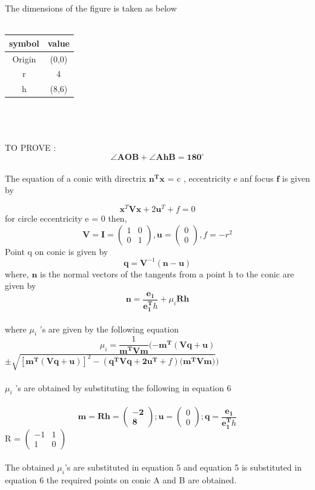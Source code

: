 \documentclass[journal,10pt,twocolumn]{article}
\let\vec\mathbf
\newcommand{\myvec}[1]{\ensuremath{\begin{pmatrix}#1\end{pmatrix}}}
\begin{document}
The dimensions of the figure is taken as below\\\\
{
\setlength\extrarowheight{2pt}
\centering
	\begin{tabular}{|c|c|}
	\hline
	\textbf{symbol}&\textbf{value}\\
	\hline
	Origin&(0,0)\\
	\hline
	r&4\\
	\hline
	h&(8,6)\\
	\hline
\end{tabular}
}
\\\\\\

TO PROVE :
\begin{equation}
	 \boldsymbol{\angle{AOB} + \angle{AhB} = 180^\circ}
\end{equation}\\
	The equation of a conic with directrix $\vec{n^Tx}$ = c , eccentricity e anf focus $\boldsymbol{f}$ is given by
	
\begin{equation}
	\vec{x}^T\vec{V}\vec{x} + 2\vec{u}^T + f = 0
\end{equation}
	for circle eccentricity e = 0 then,\\
\begin{equation}
	\vec{V} = \vec{I} = \myvec{1&0\\0&1} , \vec{u} = \myvec{0\\0} , f = -r^2
\end{equation}
Point q on conic is given by 
\begin{equation}
	\vec{q} = \vec{V}^{-1}(\vec{n} - \vec{u})
\end{equation}
where, $\vec{n}$ is the normal vectors of the tangents from a point h to the conic are given by 
\begin{equation}
	\vec{n} = \frac{\vec{e_1}}{\vec{e_1^T}h} + \mu_i\vec{Rh}
\end{equation}
\\
where $\mu _i$ 's are given by the following equation
\begin{equation}
	\mu_i = \frac{1}{\vec{m^TVm}}(-\vec{m^T(Vq+u)}	
\end{equation}
	 			$ \pm \sqrt{[\vec{m^T(Vq+u)}]^2 - (\vec{q^TVq + 2u^T }+ f)(\vec{m^TVm)}})$
\\\\
$\mu _i$ 's are obtained by substituting the following in equation 6\\\\
\begin{equation}
	\vec{m = Rh = \myvec{-2\\8}}  ;  \vec{u}  = \myvec{0\\0}  ;  \vec{q} = \frac{\vec{e_1}}{\vec{e_1^T}h}
\end{equation}
 R = $\myvec{-1&1\\1&0}$ 
\\\\
The obtained $\mu_i$'s are substituted in equation 5 and equation 5 is substituted in equation 6 the required points on conic A and B are obtained.\\\\
\end{document}
